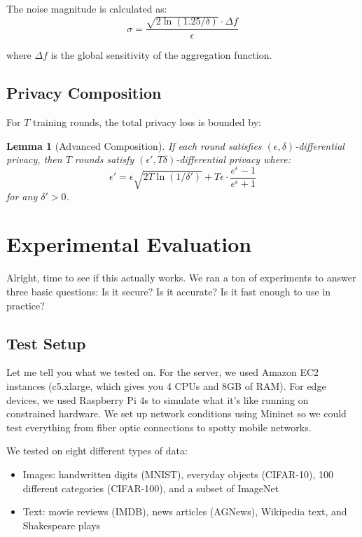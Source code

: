 \documentclass[journal]{IEEEtran}
\newtheorem{lemma}[theorem]{Lemma}
\begin{document}
The noise magnitude is calculated as:
$$\sigma = \frac{\sqrt{2\ln(1.25/\delta)} \cdot \Delta f}{\epsilon}$$

where $\Delta f$ is the global sensitivity of the aggregation function.

\subsection{Privacy Composition}

For $T$ training rounds, the total privacy loss is bounded by:

\begin{lemma}[Advanced Composition]
If each round satisfies $(\epsilon, \delta)$-differential privacy, then $T$ rounds satisfy $(\epsilon', T\delta)$-differential privacy where:
$$\epsilon' = \epsilon\sqrt{2T\ln(1/\delta')} + T\epsilon \cdot \frac{e^\epsilon - 1}{e^\epsilon + 1}$$
for any $\delta' > 0$.
\end{lemma}

\section{Experimental Evaluation}
\label{sec:evaluation}

Alright, time to see if this actually works. We ran a ton of experiments to answer three basic questions: Is it secure? Is it accurate? Is it fast enough to use in practice?

\subsection{Test Setup}

Let me tell you what we tested on. For the server, we used Amazon EC2 instances (c5.xlarge, which gives you 4 CPUs and 8GB of RAM). For edge devices, we used Raspberry Pi 4s to simulate what it's like running on constrained hardware. We set up network conditions using Mininet so we could test everything from fiber optic connections to spotty mobile networks.

We tested on eight different types of data:
\begin{itemize}
\item Images: handwritten digits (MNIST), everyday objects (CIFAR-10), 100 different categories (CIFAR-100), and a subset of ImageNet
\item Text: movie reviews (IMDB), news articles (AGNews), Wikipedia text, and Shakespeare plays
\end{itemize}
\end{document}
